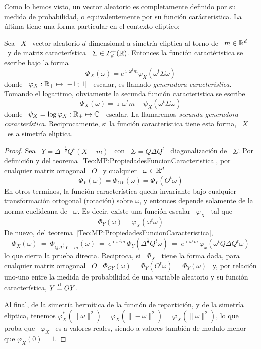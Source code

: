 Como lo hemos visto, un vector aleatorio es completamente definido por su medida
de  probabilidad,  o  equivalentemente  por su  funci\'on  car\'acteristica.  La
\'ultima tiene una forma particular en el contexto eliptico:
%
\begin{teorema}\label{Teo:MP:GeneradorasCaracteristicas}
%
  Sea \ $X$ \ vector aleatorio $d$-dimensional a simetr\'ia eliptica al torno de
  \   $m  \in  \mathbb{R}^d$   \  y   de  matriz   caracter\'istica  \   $\Sigma  \in
  P_d^+(\mathbb{R})$. Entonces la funci\'on caract\'eristica se escribe bajo la forma
  \[
  \Phi_X(\omega)  = e^{\imath  \,  \omega^t m}  \varphi_X\left( \omega^t  \Sigma
    \omega \right)
  \]
  donde  \  $\varphi_X:  \mathbb{R}_+  \mapsto  [-1 \, ; \, 1]$ \  escalar,  es  llamado  {\em
    generadora  caracter\'istica}. Tomando el  logaritmo, obviamente  la secunda
  funci\'on caracteristica se escribe
  \[
  \Psi_X(\omega) =  \imath \, \omega^t  m + \psi_X\left( \omega^t  \Sigma \omega
  \right)
  \]
  donde  \ $\psi_X  =  \log \varphi_X:  \mathbb{R}_+  \mapsto \mathbb{C}$  \ escalar.   La
  llamaremos  {\em secunda generadora  caracter\'istica}. Reciprocamente,  si la
  funci\'on caracter\'istica tiene esta forma, \ $X$ \ es a simetr\'ia eliptica.
\end{teorema}
%
\begin{proof}
  Sea \  $Y = \Delta^{-\frac12} Q^t  \left( X - m  \right)$ \ con \  $\Sigma = Q
  \Delta  Q^t$  \ diagonalizaci\'on  de  \  $\Sigma$.   Por definici\'on  y  del
  teorema~\ref{Teo:MP:PropiedadesFuncionCaracteristica},  por  cualquier  matriz
  ortogonal \ $O$ \ y cualquier \ $\omega \in \mathbb{R}^d$
  \[
  \Phi_Y(\omega) = \Phi_{O Y}(\omega) = \Phi_Y(O^t \omega)
  \]
  En  otros  terminos,  la  funci\'on  caracter\'istica  queda  invariante  bajo
  cualquier transformaci\'on  ortogonal (rotaci\'on) sobre  $\omega$, y entonces
  depende solamente de  la norma euclideana de \ $\omega$.  Es decir, existe una
  funci\'on escalar \ $\varphi_X$ \ tal que
  \[
  \Phi_Y(\omega) = \varphi_X(\omega^t \omega)
  \]
  De nuevo, del teorema~\ref{Teo:MP:PropiedadesFuncionCaracteristica},
  \[
  \Phi_X(\omega)  \:  = \:  \Phi_{Q  \Delta^{\frac12} Y  +  m}(\omega)  \: =  \:
  e^{\imath  \, \omega^t  m} \,  \Phi_Y( \Delta^{\frac12}  Q^t \omega)  \:  = \:
  e^{\imath \, \omega^t m} \, \varphi_x( \omega^t Q \Delta Q^t \omega)
  \]
  lo que  cierra la prueba  directa. Reciproca, si  \ $\Phi_X$ \ tiene  la forma
  dada, para  cualquier matriz ortogonal \  $O$ \ $\Phi_{O  Y}(\omega) = \Phi_Y(
  O^t \omega ) = \Phi_Y(\omega)$ \  y, por relaci\'on uno-uno entre la medida de
  probabilidad  de una variable  aleatorio y  su funci\'on  caracter\'istica, $Y
  \stackrel{\mathrm{d}}{=} O Y$.

  Al final, de la simetr\'ia herm\'itica  de la funci\'on de repartici\'on, y de
  la simetr\'ia  eliptica, tenemos $\varphi_X^*\left(  \| \omega \|^2  \right) =
  \varphi_X\left(  \| -\omega  \|^2  \right) =  \varphi_X\left(  \| \omega  \|^2
  \right)$,  lo que proba  que \  $\varphi_X$ \  es a  valores reales,  siendo a
  valores tambi\'en de modulo menor que $\varphi_X(0) = 1$.
\end{proof}

